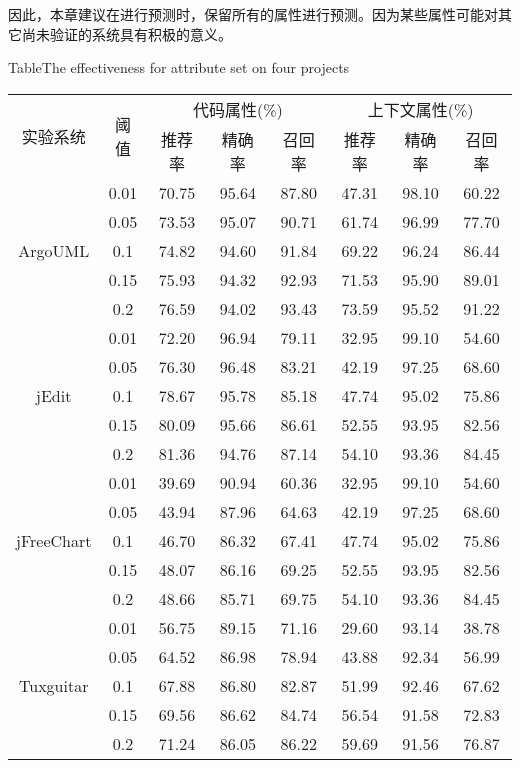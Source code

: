 因此，本章建议在进行预测时，保留所有的属性进行预测。因为某些属性可能对其它尚未验证的系统具有积极的意义。

\begin{table}[htbp]
{Table$\!$}{The effectiveness for attribute set on four projects}
\vspace{0.5em}
\centering
\wuhao
\begin{tabular}{cccccccc}
\toprule[1.5pt]
\multirow{2}{*}{实验系统}&\multirow{2}{*}{阈值}&\multicolumn{3}{c}{代码属性(\%)}&\multicolumn{3}{c}{上下文属性(\%)}\\
\cline{3-8}
&&推荐率&精确率&召回率&推荐率&精确率&召回率\\
\midrule[1pt]
\multirow{5}{*}{ArgoUML}
&0.01&	70.75&	95.64&	87.80&	47.31&	98.10&	60.22\\
&0.05&	73.53&	95.07&	90.71&	61.74&	96.99&	77.70\\
&0.1&	74.82&	94.60&	91.84&	69.22&	96.24&	86.44\\
&0.15&	75.93&	94.32&	92.93&	71.53&	95.90&	89.01\\
&0.2&	76.59&	94.02&	93.43&	73.59&	95.52&	91.22\\
\hline
\multirow{5}{*}{jEdit}
&0.01&	72.20&    96.94&	79.11&	32.95&	99.10&	54.60\\
&0.05&	76.30&	96.48&	83.21&	42.19&	97.25&	68.60\\
&0.1&	78.67&	95.78&	85.18&	47.74&	95.02&	75.86\\
&0.15&	80.09&	95.66&	86.61&	52.55&	93.95&	82.56\\
&0.2&	81.36&	94.76&	87.14&	54.10&	93.36&	84.45\\
\hline
\multirow{5}{*}{jFreeChart}
&0.01&	39.69&	90.94&	60.36&	32.95&	99.10&	54.60\\
&0.05&	43.94&	87.96&	64.63&	42.19&	97.25&	68.60\\
&0.1&	46.70&	86.32&	67.41&	47.74&	95.02&	75.86\\
&0.15&	48.07&	86.16&	69.25&	52.55&	93.95&	82.56\\
&0.2&	48.66&	85.71&	69.75&	54.10&	93.36&	84.45\\
\hline
\multirow{5}{*}{Tuxguitar}
&0.01&	56.75&	89.15&	71.16&	29.60&	93.14&	38.78\\
&0.05&	64.52&	86.98&	78.94&	43.88&	92.34&	56.99\\
&0.1&	67.88&	86.80&	82.87&	51.99&	92.46&	67.62\\
&0.15&	69.56&	86.62&	84.74&	56.54&	91.58&	72.83\\
&0.2&	71.24&	86.05&	86.22&	59.69&	91.56&	76.87\\
\bottomrule[1.5pt]
\end{tabular}
\end{table}

